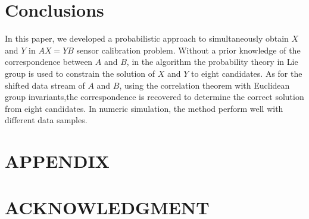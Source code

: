 \documentclass[letterpaper, 10 pt, conference]{ieeeconf}  %
\begin{document}
\section{Conclusions}
\label{sect5}

In this paper, we developed a probabilistic approach to simultaneously obtain  $X$ and $Y$ in $AX=YB$ sensor calibration problem. Without a prior knowledge of the correspondence between $A$ and $B$, in the algorithm the probability theory in Lie group is used to constrain the solution of $X$ and $Y$ to eight candidates. As for the shifted data stream of $A$ and $B$, using the correlation theorem with Euclidean group invariants,the correspondence is recovered to determine the correct solution from eight candidates. In numeric simulation, the method perform well with different data samples.

\addtolength{\textheight}{-12cm}   %







\section*{APPENDIX}



\section*{ACKNOWLEDGMENT}







%
%
\end{document}
